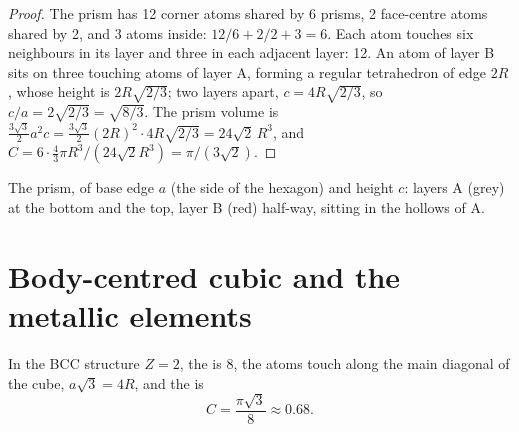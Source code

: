 \begin{proof}
The prism has 12 corner atoms shared by 6 prisms, 2 face-centre atoms
shared by 2, and 3 atoms inside: $12/6 + 2/2 + 3 = 6$. Each atom touches
six neighbours in its layer and three in each adjacent layer: 12. An atom
of layer B sits on three touching atoms of layer A, forming a regular
tetrahedron of edge $2R$, whose height is $2R\sqrt{2/3}$; two layers
apart, $c = 4R\sqrt{2/3}$, so $c/a = 2\sqrt{2/3} = \sqrt{8/3}$. The prism
volume is $\frac{3\sqrt3}{2}a^2 c = \frac{3\sqrt3}{2}(2R)^2 \cdot
4R\sqrt{2/3} = 24\sqrt2\,R^3$, and $C = 6 \cdot \frac43\pi R^3/(24\sqrt2
R^3) = \pi/(3\sqrt2)$.
\end{proof}

\begin{omfigure}

{\small The  prism, of base edge $a$ (the side of
the hexagon) and height $c$: layers A (grey) at the bottom and the top,
layer B (red) half-way, sitting in the hollows of A.}
\end{omfigure}

\section{Body-centred cubic and the metallic elements}

\begin{proposition}\label{prop:b1:crystals-metals:bcc}
In the BCC structure $Z = 2$, the  is 8, the atoms
touch along the main diagonal of the cube, $a\sqrt3 = 4R$, and the
 is
\[
  C = \frac{\pi\sqrt3}{8} \approx 0.68 .
\]
\end{proposition}

